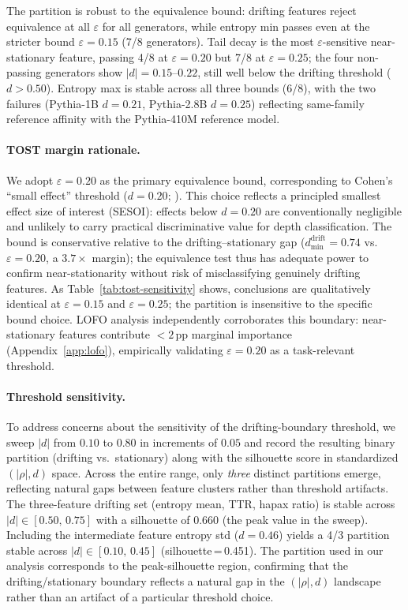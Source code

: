 The partition is robust to the equivalence bound: drifting features reject equivalence at all $\varepsilon$ for all generators, while entropy min passes even at the stricter bound $\varepsilon{=}0.15$ (7/8 generators).
Tail decay is the most $\varepsilon$-sensitive near-stationary feature, passing 4/8 at $\varepsilon{=}0.20$ but 7/8 at $\varepsilon{=}0.25$; the four non-passing generators show $|d|{=}0.15$--$0.22$, still well below the drifting threshold ($d > 0.50$).
Entropy max is stable across all three bounds (6/8), with the two failures (Pythia-1B $d{=}0.21$, Pythia-2.8B $d{=}0.25$) reflecting same-family reference affinity with the Pythia-410M reference model.

\paragraph{TOST margin rationale.}
We adopt $\varepsilon{=}0.20$ as the primary equivalence bound, corresponding to Cohen's ``small effect'' threshold ($d{=}0.20$; \citealp{cohen1988statistical}).
This choice reflects a principled smallest effect size of interest (SESOI): effects below $d{=}0.20$ are conventionally negligible and unlikely to carry practical discriminative value for depth classification.
The bound is conservative relative to the drifting--stationary gap ($d_{\min}^{\text{drift}}{=}0.74$ vs.\ $\varepsilon{=}0.20$, a $3.7{\times}$ margin); the equivalence test thus has adequate power to confirm near-stationarity without risk of misclassifying genuinely drifting features.
As Table~\ref{tab:tost-sensitivity} shows, conclusions are qualitatively identical at $\varepsilon{=}0.15$ and $\varepsilon{=}0.25$; the partition is insensitive to the specific bound choice.
LOFO analysis independently corroborates this boundary: near-stationary features contribute ${<}2$\,pp marginal importance (Appendix~\ref{app:lofo}), empirically validating $\varepsilon{=}0.20$ as a task-relevant threshold.

\paragraph{Threshold sensitivity.}
To address concerns about the sensitivity of the drifting-boundary threshold,
we sweep $|d|$ from $0.10$ to $0.80$ in increments of $0.05$ and record the
resulting binary partition (drifting vs.\ stationary) along with the silhouette
score in standardized $(|\rho|, d)$ space.
Across the entire range, only \emph{three} distinct partitions emerge,
reflecting natural gaps between feature clusters rather than threshold artifacts.
The three-feature drifting set (entropy mean, TTR, hapax ratio)
is stable across $|d| \in [0.50,\, 0.75]$ with a silhouette of $0.660$ (the
peak value in the sweep).
Including the intermediate feature entropy std ($d{=}0.46$) yields a
4/3 partition stable across $|d| \in [0.10,\, 0.45]$ (silhouette\,=\,0.451).
The partition used in our analysis corresponds to the peak-silhouette region,
confirming that the drifting/stationary boundary reflects a natural gap in the
$(|\rho|, d)$ landscape rather than an artifact of a particular
threshold choice.

